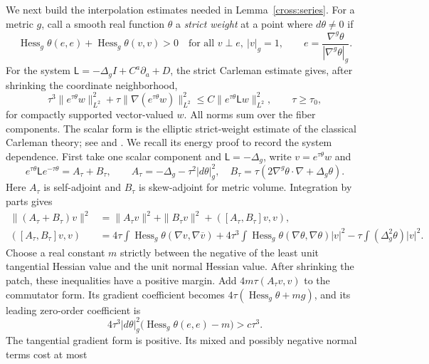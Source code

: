 We next build the interpolation estimates needed in
Lemma~\ref{cross:series}.  For a metric $g$, call a smooth real function
$\theta$ a \emph{strict weight} at a point where $d\theta\ne0$ if
\begin{equation}\label{cross:strict-weight}
 \operatorname{Hess}_g\theta(e,e)
  +\operatorname{Hess}_g\theta(v,v)>0
 \quad\text{for all }v\perp e,\ |v|_g=1,
 \qquad e=\frac{\nabla^g\theta}{|\nabla^g\theta|_g}.
\end{equation}
For the system $\mathsf L=-\Delta_gI+C^a\partial_a+D$, the strict
Carleman estimate gives, after shrinking the coordinate neighborhood,
\begin{equation}\label{cross:carleman}
 \tau^3\|e^{\tau\theta}w\|_{L^2}^2
 +\tau\|\nabla(e^{\tau\theta}w)\|_{L^2}^2
 \le C\|e^{\tau\theta}\mathsf Lw\|_{L^2}^2,
 \qquad \tau\ge\tau_0,
\end{equation}
for compactly supported vector-valued $w$.  All norms sum over the
fiber components.  The scalar form is the elliptic strict-weight estimate
of the classical
Carleman theory; see \cite[Chapter~XXVIII]{HormanderIV2009} and
\cite[Definition~8.3 and Theorem~9(a)]{KochTataru2005}.
We recall its energy proof to record the system dependence.  First take
one scalar component and $\mathsf L=-\Delta_g$,
write $v=e^{\tau\theta}w$ and
\[
 e^{\tau\theta}\mathsf Le^{-\tau\theta}=A_\tau+B_\tau,\qquad
 A_\tau=-\Delta_g-\tau^2|d\theta|_g^2,\quad
 B_\tau=\tau(2\nabla^g\theta\cdot\nabla+\Delta_g\theta).
\]
Here $A_\tau$ is self-adjoint and $B_\tau$ is skew-adjoint for
metric volume.  Integration by parts gives
\begin{align*}
 \|(A_\tau+B_\tau)v\|^2
 &=\|A_\tau v\|^2+\|B_\tau v\|^2
       +([A_\tau,B_\tau]v,v),\\
 ([A_\tau,B_\tau]v,v)
 &=4\tau\int\operatorname{Hess}_g\theta(\nabla v,\nabla\overline v)
   +4\tau^3\int\operatorname{Hess}_g\theta
                 (\nabla\theta,\nabla\theta)|v|^2
   -\tau\int(\Delta_g^2\theta)|v|^2.
\end{align*}
Choose a real constant $m$ strictly between the negative of the least
unit tangential Hessian value and the unit normal Hessian value.
After shrinking the patch, these inequalities have a positive margin.
Add $4m\tau(A_\tau v,v)$ to the commutator form.  Its gradient
coefficient becomes $4\tau(\operatorname{Hess}_g\theta+mg)$,
and its leading zero-order coefficient is
\[
 4\tau^3|d\theta|_g^2
       \big(\operatorname{Hess}_g\theta(e,e)-m\big)>c\tau^3.
\]
The tangential gradient form is positive.  Its mixed and possibly
negative normal terms cost at most
